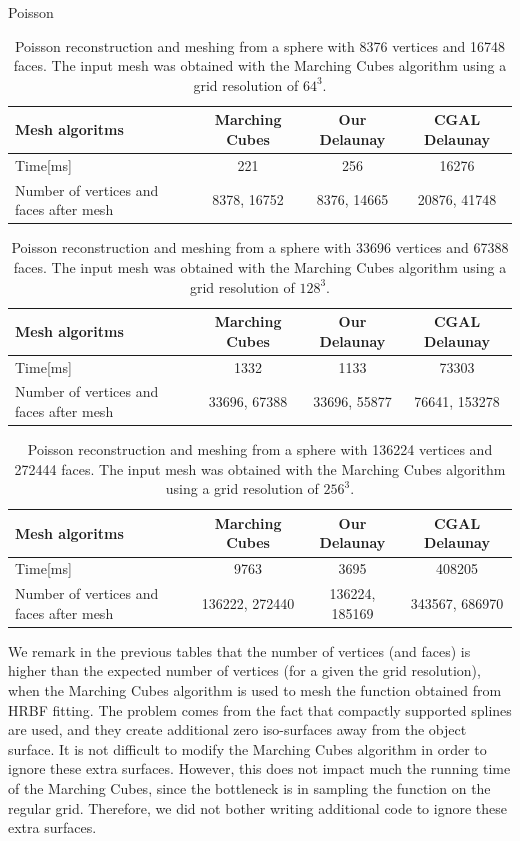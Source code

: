\documentclass{article}
\begin{document}
\begin{table}
 \caption{Poisson reconstruction and meshing from a sphere with 8376 vertices and 16748 faces. The input mesh was obtained with the Marching Cubes algorithm using a grid resolution of $64^3$.}
\noindent
Poisson\\
  \begin{tabular}{|l|c|c|c|} \hline
    Mesh algoritms & Marching Cubes & Our Delaunay & CGAL Delaunay \\  \hline
    Time[ms] & 221 & 256 & 16276\\ \hline
    Number of vertices and faces after mesh & 8378, 16752 & 8376, 14665 &20876, 41748 \\ \hline
  \end{tabular}
\end{table}

\begin{table}
 \caption{Poisson reconstruction and meshing from a sphere with 33696 vertices and 67388 faces. The input mesh was obtained with the Marching Cubes algorithm using a grid resolution of $128^3$.}
  \begin{tabular}{|l|c|c|c|} \hline
    Mesh algoritms & Marching Cubes & Our Delaunay & CGAL Delaunay \\  \hline
    Time[ms] & 1332 & 1133 & 73303\\ \hline
    Number of vertices and faces after mesh & 33696, 67388 & 33696, 55877 &76641, 153278 \\ \hline
  \end{tabular}
 \end{table} 
 



\begin{table}
 \caption{Poisson reconstruction and meshing from a sphere with 136224 vertices and 272444 faces. The input mesh was obtained with the Marching Cubes algorithm using a grid resolution of $256^3$.}
  \begin{tabular}{|l|c|c|c|} \hline
    Mesh algoritms & Marching Cubes & Our Delaunay & CGAL Delaunay \\  \hline
    Time[ms] & 9763 & 3695 & 408205\\ \hline
    Number of vertices and faces after mesh & 136222, 272440& 136224, 185169 &343567, 686970 \\ \hline
  \end{tabular}

\end{table}

We remark in the previous tables that the number of vertices (and faces) is higher than the expected number of vertices (for a given the grid resolution), when the Marching Cubes algorithm is used to mesh the function obtained from HRBF fitting.
The problem comes from the fact that compactly supported splines are used, and they create additional zero iso-surfaces away from the object surface. It is not difficult to modify the Marching Cubes algorithm in order to ignore these extra surfaces. However, this does not impact much the running time of the Marching Cubes, since the bottleneck is in sampling the function on the regular grid. Therefore, we did not bother writing additional code to ignore these extra surfaces.
\end{document}
